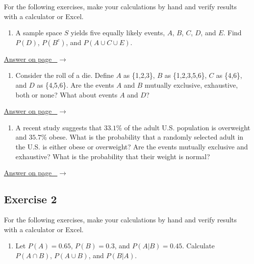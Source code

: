 \documentclass[
  11pt,
  letterpaper,
  DIV=11,
  numbers=noendperiod,
  oneside,
  open=any]{scrreprt}
\providecommand{\tightlist}{%
  \setlength{\itemsep}{0pt}\setlength{\parskip}{0pt}}\usepackage{longtable,booktabs,array}
\newcommand{\bsanswerref}[1]{%
  \par\nopagebreak\hypertarget{q-#1}{}\label{q-#1}%
  {\raggedleft\sffamily\footnotesize\hyperlink{a-#1}{\textcolor{bsaccent}{Answer on page \pageref{a-#1}\ $\rightarrow$}}\par}%
  \medskip}
\begin{document}
For the following exercises, make your calculations by hand and verify
results with a calculator or Excel.

\begin{enumerate}
\def\labelenumi{\arabic{enumi}.}
\tightlist
\item
  A sample space \(S\) yields five equally likely events, \(A\), \(B\),
  \(C\), \(D\), and \(E\). Find \(P(D)\), \(P(B^c)\), and
  \(P(A \cup C \cup E)\).
\end{enumerate}

\bsanswerref{bsans70}

\begin{enumerate}
\def\labelenumi{\arabic{enumi}.}
\setcounter{enumi}{1}
\tightlist
\item
  Consider the roll of a die. Define \(A\) as \{1,2,3\}, \(B\) as
  \{1,2,3,5,6\}, \(C\) as \{4,6\}, and \(D\) as \{4,5,6\}. Are the
  events \(A\) and \(B\) mutually exclusive, exhaustive, both or none?
  What about events \(A\) and \(D\)?
\end{enumerate}

\bsanswerref{bsans71}

\begin{enumerate}
\def\labelenumi{\arabic{enumi}.}
\setcounter{enumi}{2}
\tightlist
\item
  A recent study suggests that \(33.1\)\% of the adult U.S. population
  is overweight and \(35.7\)\% obese. What is the probability that a
  randomly selected adult in the U.S. is either obese or overweight? Are
  the events mutually exclusive and exhaustive? What is the probability
  that their weight is normal?
\end{enumerate}

\bsanswerref{bsans72}

\subsection*{Exercise 2}\label{exercise-2-7}

For the following exercises, make your calculations by hand and verify
results with a calculator or Excel.

\begin{enumerate}
\def\labelenumi{\arabic{enumi}.}
\tightlist
\item
  Let \(P(A)=0.65\), \(P(B)=0.3\), and \(P(A|B)=0.45\). Calculate
  \(P(A \cap B)\), \(P(A \cup B)\), and \(P(B|A)\).
\end{enumerate}
\end{document}
